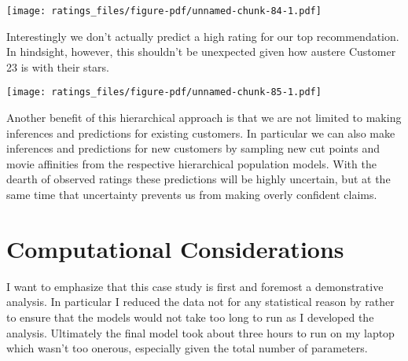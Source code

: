 \documentclass[
  letterpaper,
  DIV=11,
  numbers=noendperiod]{scrartcl}
\newenvironment{Shaded}{\begin{snugshade}}{\end{snugshade}}
\newcommand{\AttributeTok}[1]{\textcolor[rgb]{0.40,0.45,0.13}{#1}}
\newcommand{\DecValTok}[1]{\textcolor[rgb]{0.68,0.00,0.00}{#1}}
\newcommand{\FloatTok}[1]{\textcolor[rgb]{0.68,0.00,0.00}{#1}}
\newcommand{\FunctionTok}[1]{\textcolor[rgb]{0.28,0.35,0.67}{#1}}
\newcommand{\NormalTok}[1]{\textcolor[rgb]{0.00,0.23,0.31}{#1}}
\newcommand{\SpecialCharTok}[1]{\textcolor[rgb]{0.37,0.37,0.37}{#1}}
\newcommand{\StringTok}[1]{\textcolor[rgb]{0.13,0.47,0.30}{#1}}
\begin{document}
\texttt{[image: ratings\_files/figure-pdf/unnamed-chunk-84-1.pdf]}

Interestingly we don't actually predict a high rating for our top
recommendation. In hindsight, however, this shouldn't be unexpected
given how austere Customer 23 is with their stars.

\begin{Shaded}
\end{Shaded}

\texttt{[image: ratings\_files/figure-pdf/unnamed-chunk-85-1.pdf]}

Another benefit of this hierarchical approach is that we are not limited
to making inferences and predictions for existing customers. In
particular we can also make inferences and predictions for new customers
by sampling new cut points and movie affinities from the respective
hierarchical population models. With the dearth of observed ratings
these predictions will be highly uncertain, but at the same time that
uncertainty prevents us from making overly confident claims.

\section{Computational
Considerations}\label{computational-considerations}

I want to emphasize that this case study is first and foremost a
demonstrative analysis. In particular I reduced the data not for any
statistical reason by rather to ensure that the models would not take
too long to run as I developed the analysis. Ultimately the final model
took about three hours to run on my laptop which wasn't too onerous,
especially given the total number of parameters.
\end{document}

